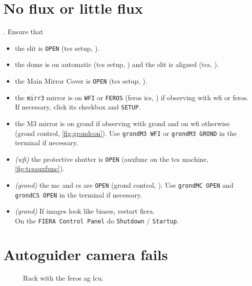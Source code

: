 \documentclass[11pt,fleqn,a4paper]{book}
\begin{document}
\section{No flux or little flux}
\label{sec:noflux}

. Ensure that
\begin{itemize}
  \item the \gls{slit} is \texttt{OPEN} (\gls{tcs} setup, ).
  \item the dome is on automatic (\gls{tcs} setup,
        ) and the slit is aligned (\gls{tcs}, ).
  \item the Main Mirror Cover is \texttt{OPEN} (\gls{tcs} setup,
        ).
  \item the \texttt{\gls{mirr3}} mirror is on \texttt{WFI} or \texttt{FEROS} (\gls{feros} \gls{ics}, 
        ) if observing with \gls{wfi} or \gls{feros}.  If necessary,
        click its checkbox and \texttt{SETUP}.
  \item the \gls{M3} mirror is on \gls{grond} if observing with \gls{grond} and on \gls{wfi} otherwise
         (\gls{grond} control, \ref{fig:grondcon}).  Use 
        \texttt{\gls{grondM3} WFI} or \texttt{\gls{grondM3} GROND} in the terminal if
        necessary.
  \item \textit{(\gls{wfi})} the \gls{protective shutter} is \texttt{OPEN} (\gls{auxfunc} 
        on the \gls{tcs} machine, \ref{fig:tcsauxfunc}). 
  \item \textit{(\gls{grond})} the \gls{mc} and \gls{cs} are \texttt{OPEN} (\gls{grond} control,
        ).  Use \texttt{\gls{grondMC} OPEN} and \texttt{\gls{grondCS} OPEN} in the terminal if necessary.
  \item \textit{(\gls{grond})} If images look like biases, restart \gls{fiera}.\\
  On the \texttt{FIERA Control Panel} do \texttt{Shutdown} / \texttt{Startup}.
\end{itemize}

\section{Autoguider camera fails}
\label{sec:agfail}

\begin{figure}[p!]
\hfill
{}\hfill
{}
\caption[Rack with FEROS AG LCU]{Rack with the \gls{feros} \gls{ag} \gls{lcu}.}
\label{fig:l2p2cam}
\end{figure}
\end{document}
